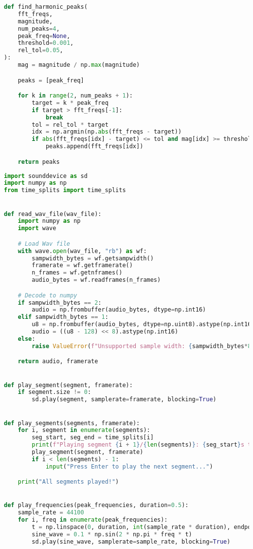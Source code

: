 \begin{lstlisting}[language=Python, caption={fft.py}, label={lst:fft}]
def find_harmonic_peaks(
    fft_freqs,
    magnitude,
    num_peaks=4,
    peak_freq=None,
    threshold=0.001,
    rel_tol=0.05,
):
    mag = magnitude / np.max(magnitude)

    peaks = [peak_freq]

    for k in range(2, num_peaks + 1):
        target = k * peak_freq
        if target > fft_freqs[-1]:
            break
        tol = rel_tol * target
        idx = np.argmin(np.abs(fft_freqs - target))
        if abs(fft_freqs[idx] - target) <= tol and mag[idx] >= threshold:
            peaks.append(fft_freqs[idx])

    return peaks

    \end{lstlisting}

\begin{lstlisting}[language=Python, caption={audio.py}, label={lst:audio}]
import sounddevice as sd
import numpy as np
from time_splits import time_splits


def read_wav_file(wav_file):
    import numpy as np
    import wave

    # Load Wav file
    with wave.open(wav_file, "rb") as wf:
        sampwidth_bytes = wf.getsampwidth()
        framerate = wf.getframerate()
        n_frames = wf.getnframes()
        audio_bytes = wf.readframes(n_frames)

    # Decode to numpy
    if sampwidth_bytes == 2:
        audio = np.frombuffer(audio_bytes, dtype=np.int16)
    elif sampwidth_bytes == 1:
        u8 = np.frombuffer(audio_bytes, dtype=np.uint8).astype(np.int16)
        audio = ((u8 - 128) << 8).astype(np.int16)
    else:
        raise ValueError(f"Unsupported sample width: {sampwidth_bytes*8} bits")

    return audio, framerate


def play_segment(segment, framerate):
    if segment.size != 0:
        sd.play(segment, samplerate=framerate, blocking=True)


def play_segments(segments, framerate):
    for i, segment in enumerate(segments):
        seg_start, seg_end = time_splits[i]
        print(f"Playing segment {i + 1}/{len(segments)}: {seg_start}s to {seg_end}s")
        play_segment(segment, framerate)
        if i < len(segments) - 1:
            input("Press Enter to play the next segment...")

    print("All segments played!")


def play_frequencies(peak_frequencies, duration=0.5):
    sample_rate = 44100
    for i, freq in enumerate(peak_frequencies):
        t = np.linspace(0, duration, int(sample_rate * duration), endpoint=False)
        sine_wave = 0.1 * np.sin(2 * np.pi * freq * t)
        sd.play(sine_wave, samplerate=sample_rate, blocking=True)

\end{lstlisting}


